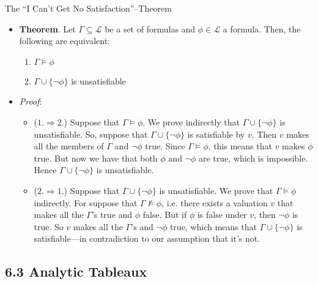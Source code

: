 \documentclass[../slides.tex]{subfiles}
\begin{document}
\begin{frame}{The ``I Can't Get No Satisfaction''--Theorem}

	\begin{itemize}
		
		\item \textbf{Theorem}. Let $\Gamma\subseteq\mathcal{L}$ be a set of formulas and $\phi\in\mathcal{L}$ a formula. Then, the following are equivalent:
			\begin{enumerate}[1.]
			
				\item $\Gamma\vDash\phi$
				
				\item $\Gamma\cup\{\neg\phi\}$ is unsatisfiable
			
			\end{enumerate}
			
		\item \emph{Proof}:
		
			\begin{itemize}
			
				\item ($1.\Rightarrow 2.$) Suppose that $\Gamma\vDash\phi$. We prove indirectly that $\Gamma\cup\{\neg\phi\}$ is unsatisfiable. So, suppose that  $\Gamma\cup\{\neg\phi\}$  is satisfiable by $v$. Then $v$ makes all the members of $\Gamma$ and $\neg\phi$ true. Since $\Gamma\vDash\phi$, this means that $v$ makes $\phi$ true. But now we have that both $\phi$ and $\neg\phi$ are true, which is impossible. Hence $\Gamma\cup\{\neg\phi\}$ is unsatisfiable.
				
				\item ($2.\Rightarrow 1.$) Suppose that $\Gamma\cup\{\neg\phi\}$ is unsatisfiable. We prove that $\Gamma\vDash\phi$ indirectly. For suppose that $\Gamma\nvDash\phi$, i.e. there exists a valuation $v$ that makes all the $\Gamma$'s true and $\phi$ false. But if $\phi$ is false under $v$, then $\neg\phi$ is true. So $v$ makes all the $\Gamma$'s and $\neg\phi$ true, which means that $\Gamma\cup\{\neg\phi\}$ is satisfiable---in contradiction to our assumption that it's not.
			
			\end{itemize}

	\end{itemize}

\end{frame}

\subsection{6.3 Analytic Tableaux}
\end{document}
